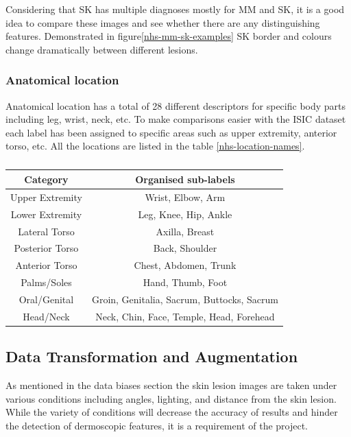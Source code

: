 Considering that SK has multiple diagnoses mostly for MM and SK, it is a good idea to compare these images and see whether there are any distinguishing features. Demonstrated in figure\ref{nhs-mm-sk-examples} SK border and colours change dramatically between different lesions.

\subsubsection{Anatomical location}

Anatomical location has a total of 28 different descriptors for specific body parts including leg, wrist, neck, etc. To make comparisons easier with the ISIC dataset each label has been assigned to specific areas such as upper extremity, anterior torso, etc. All the locations are listed in the table \ref{nhs-location-names}. 


\begin{table}
    \centering
    \begin{tabular}{|c|c|}
        \hline
        Category & Organised sub-labels
        \\
        \hline
        Upper Extremity & Wrist, Elbow, Arm
        \\
        \hline
        Lower Extremity & Leg, Knee, Hip, Ankle
        \\
        \hline
        Lateral Torso & Axilla, Breast
        \\
        \hline
        Posterior Torso & Back, Shoulder
        \\
        \hline
        Anterior Torso & Chest, Abdomen, Trunk
        \\
        \hline
        Palms/Soles & Hand, Thumb, Foot
        \\
        \hline
        Oral/Genital & Groin, Genitalia, Sacrum, Buttocks, Sacrum
        \\
        \hline
        Head/Neck & Neck, Chin, Face, Temple, Head, Forehead
        \\
        \hline
    \end{tabular}
    \caption{}
\end{table} \label{nhs-location-names}

\subsection{Data Transformation and Augmentation}
As mentioned in the data biases section the skin lesion images are taken under various conditions including angles, lighting, and distance from the skin lesion. While the variety of conditions will decrease the accuracy of results and hinder the detection of dermoscopic features, it is a requirement of the project.

